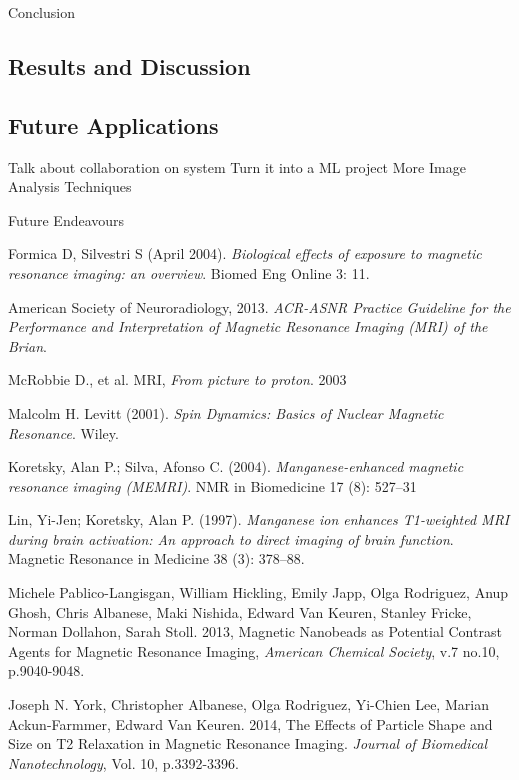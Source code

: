 \documentclass[a4paper,12pt]{article}
\begin{document}
\newpage
\begin{section}{Conclusion}
\subsection{Results and Discussion}

\subsection{Future Applications}

Talk about collaboration on system
	Turn it into a ML project
	More Image Analysis Techniques

Future Endeavours
\end{section}

\newpage
\singlespacing
\begin{thebibliography}{9}

Formica D, Silvestri S (April 2004). {\em Biological effects of exposure to magnetic resonance imaging: an overview}. Biomed Eng Online 3: 11. 

American Society of Neuroradiology, 2013. {\em ACR-ASNR Practice Guideline for the Performance and Interpretation of Magnetic Resonance Imaging (MRI) of the Brian}.

McRobbie D., et al. MRI, {\em From picture to proton}. 2003

Malcolm H. Levitt (2001). {\em Spin Dynamics: Basics of Nuclear Magnetic Resonance}. Wiley.

Koretsky, Alan P.; Silva, Afonso C. (2004). {\em Manganese-enhanced magnetic resonance imaging (MEMRI)}. NMR in Biomedicine 17 (8): 527–31

Lin, Yi-Jen; Koretsky, Alan P. (1997). {\em Manganese ion enhances T1-weighted MRI during brain activation: An approach to direct imaging of brain function}. Magnetic Resonance in Medicine 38 (3): 378–88.

Michele Pablico-Langisgan, William Hickling, Emily Japp, Olga Rodriguez, Anup Ghosh, Chris Albanese, Maki Nishida, Edward Van Keuren, Stanley Fricke, Norman Dollahon, Sarah Stoll. 2013, Magnetic Nanobeads as Potential Contrast Agents for Magnetic Resonance Imaging, {\em American Chemical Society}, v.7 no.10, p.9040-9048.

Joseph N. York, Christopher Albanese, Olga Rodriguez, Yi-Chien Lee, Marian Ackun-Farmmer, Edward Van Keuren. 2014, The Effects of Particle Shape and Size on T2 Relaxation in Magnetic Resonance Imaging. {\em Journal of Biomedical Nanotechnology}, Vol. 10, p.3392-3396.


\end{thebibliography}
\end{document}
